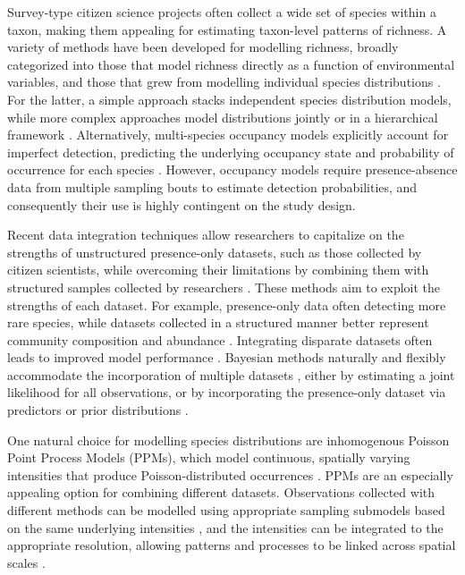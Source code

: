 \documentclass[preprint,final,times,12pt,3p]{elsarticle}
\begin{document}
Survey-type citizen science projects often collect a wide set of species within a taxon, making them appealing for estimating taxon-level patterns of richness. A variety of methods have been developed for modelling richness, broadly categorized into those that model richness directly as a function of environmental variables, and those that grew from modelling individual species distributions \citep{Dubuis2011,Guisan2011,Calabrese2014,Biber2019}. For the latter, a simple approach stacks independent species distribution models, while more complex approaches model distributions jointly or in a hierarchical framework \citep{Caradima2019}. Alternatively, multi-species occupancy models explicitly account for imperfect detection, predicting the underlying occupancy state and probability of occurrence for each species \citep{Frishkoff2019,Guillera-Arroita2019,Szewczyk2018,Devarajan2020}. However, occupancy models require presence-absence data from multiple sampling bouts to estimate detection probabilities, and consequently their use is highly contingent on the study design.

Recent data integration techniques allow researchers to capitalize on the strengths of unstructured presence-only datasets, such as those collected by citizen scientists, while overcoming their limitations by combining them with structured samples collected by researchers \citep{Isaac2019,Miller2019}. These methods aim to exploit the strengths of each dataset. For example, presence-only data often detecting more rare species, while datasets collected in a structured manner better represent community composition and abundance \citep{Steen2019,Henckel2020,Pernat2020}. Integrating disparate datasets often leads to improved model performance \citep{Dorazio2014b,Fithian2015,Koshkina2017a}. Bayesian methods naturally and flexibly accommodate the incorporation of multiple datasets \citep{Clark2005,BeckEtAl2012,Szewczyk2018}, either by estimating a joint likelihood for all observations, or by incorporating the presence-only dataset via predictors or prior distributions \citep{Fletcher2019,Isaac2019,Miller2019}. 

One natural choice for modelling species distributions are inhomogenous Poisson Point Process Models (PPMs), which model continuous, spatially varying intensities that produce Poisson-distributed occurrences \citep{Renner2013a,Renner2015}. PPMs are an especially appealing option for combining different datasets. Observations collected with different methods can be modelled using appropriate sampling submodels based on the same underlying intensities \citep{Fithian2015,Hefley2016,Koshkina2017a,Fletcher2019,Renner2019}, and the intensities can be integrated to the appropriate resolution, allowing patterns and processes to be linked across spatial scales \citep{Keil2014,Hefley2016}.
\end{document}
